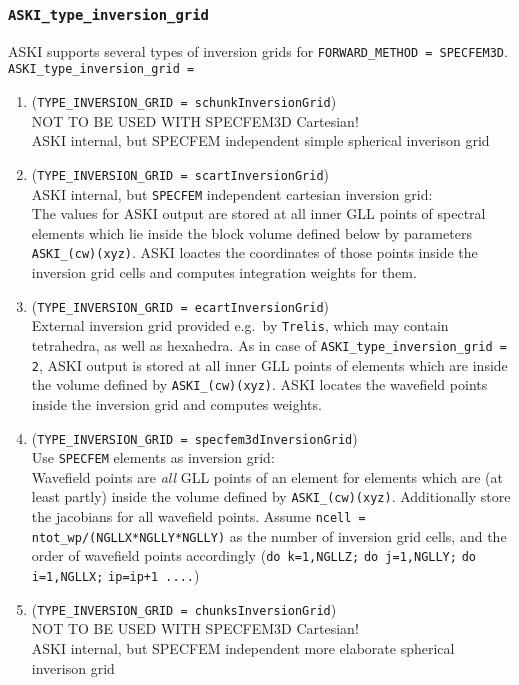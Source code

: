 \documentclass[12pt,a4paper]{article}
\newcommand{\lcode}[1]{\nolinkurl{#1}}
\newcommand{\ASKI}{ {\ttfamily ASKI} }
\begin{document}
\subsubsection*{\lcode{ASKI_type_inversion_grid}}
\ASKI{} supports several types of inversion grids for \lcode{FORWARD_METHOD = SPECFEM3D}.
\lcode{ASKI_type_inversion_grid = }
\begin{enumerate}
\item (\lcode{TYPE_INVERSION_GRID = schunkInversionGrid}) \\ 
  NOT TO BE USED WITH SPECFEM3D Cartesian!\\
  \ASKI{} internal, but SPECFEM independent simple spherical inverison grid
\item (\lcode{TYPE_INVERSION_GRID = scartInversionGrid})\\
  \ASKI{} internal, but \lcode{SPECFEM} independent cartesian inversion grid:\\
  The values for \ASKI{} output are stored at all inner GLL points of spectral elements which lie
  inside the block volume defined below by parameters \lcode{ASKI_(cw)(xyz)}.
  \ASKI{} loactes the coordinates of those points inside the inversion grid cells and computes
  integration weights for them.
\item (\lcode{TYPE_INVERSION_GRID = ecartInversionGrid}) \\
  External inversion grid provided e.g.\ by \lcode{Trelis}, which may contain tetrahedra, as well as hexahedra.
  As in case of \lcode{ASKI_type_inversion_grid = 2}, \ASKI{} output is stored at all inner GLL points of elements
  which are inside the volume defined by \lcode{ASKI_(cw)(xyz)}.
  \ASKI{} locates the wavefield points inside the inversion grid and computes weights.
\item (\lcode{TYPE_INVERSION_GRID = specfem3dInversionGrid}) \\
  Use \lcode{SPECFEM} elements as inversion grid:\\
  Wavefield points are \emph{all} GLL points of an element for elements which are (at least partly) inside the 
  volume defined by \lcode{ASKI_(cw)(xyz)}. Additionally store the jacobians for all wavefield points.
  Assume \lcode{ncell = ntot_wp/(NGLLX*NGLLY*NGLLY)} as the number of inversion grid cells, and the order of 
  wavefield points accordingly (\lcode{do k=1,NGLLZ;} \lcode{do j=1,NGLLY;} \lcode{do i=1,NGLLX;} \lcode{ip=ip+1 ....})
\item (\lcode{TYPE_INVERSION_GRID = chunksInversionGrid}) \\ 
  NOT TO BE USED WITH SPECFEM3D Cartesian!\\
  \ASKI{} internal, but SPECFEM independent more elaborate spherical inverison grid
\end{enumerate}
\end{document}
